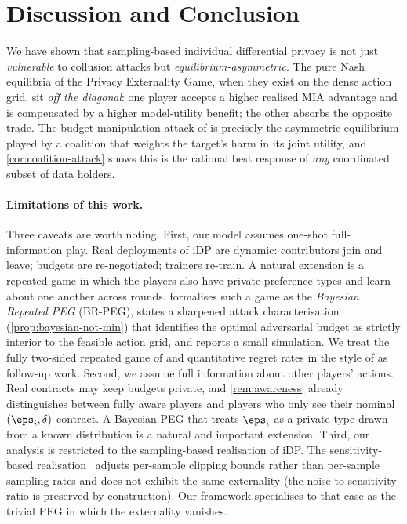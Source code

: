 \section{Discussion and Conclusion}
\label{sec:discussion}

We have shown that sampling-based individual differential privacy is not
just \emph{vulnerable} to collusion attacks but \emph{equilibrium-asymmetric}.
The pure Nash equilibria of the Privacy Externality Game, when they exist on
the dense action grid, sit \emph{off the diagonal}: one player accepts a
higher realised MIA advantage and is compensated by a higher model-utility
benefit; the other absorbs the opposite trade. The budget-manipulation
attack of \citet{kaiser2026your} is precisely the asymmetric equilibrium
played by a coalition that weights the target's harm in its joint utility,
and \cref{cor:coalition-attack} shows this is the rational best response of
\emph{any} coordinated subset of data holders.

\paragraph{Limitations of this work.} Three caveats are worth noting.
First, our model assumes one-shot full-information play. Real
deployments of iDP are dynamic: contributors join and leave; budgets are
re-negotiated; trainers re-train. A natural extension is a repeated game
in which the players also have private preference types and learn about
one another across rounds.  formalises such a game as
the \emph{Bayesian Repeated PEG} (BR-PEG), states a sharpened attack
characterisation (\cref{prop:bayesian-not-min}) that identifies the
optimal adversarial budget as strictly interior to the feasible action
grid, and reports a small simulation. We treat the fully two-sided
repeated game of \citet{aumann1995repeated} and quantitative regret
rates in the style of \citet{balcan2015commitment} as follow-up work.
Second, we assume full information about other players' actions. Real
contracts may keep budgets private, and \cref{rem:awareness} already
distinguishes between fully aware players and players who only see their
nominal $(\eps_i,\delta)$ contract. A Bayesian PEG that treats $\eps_i$ as
a private type drawn from a known distribution is a natural and important
extension.
Third, our analysis is restricted to the sampling-based realisation of iDP.
The sensitivity-based realisation~\cite{boenisch2023have} adjusts per-sample
clipping bounds rather than per-sample sampling rates and does not exhibit
the same externality (the noise-to-sensitivity ratio is preserved by
construction). Our framework specialises to that case as the trivial PEG in
which the externality vanishes.

